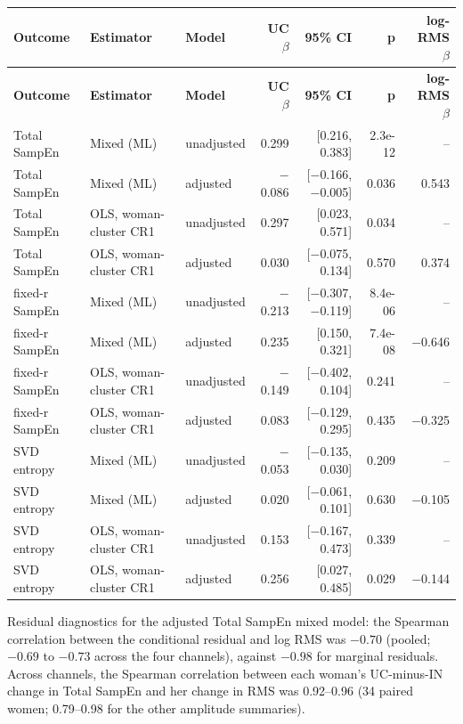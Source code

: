 \documentclass[10pt]{article}
\begin{document}
\begin{longtable}{p{2.8cm}p{3.2cm}p{1.8cm}rrrr}
\toprule
\textbf{Outcome} & \textbf{Estimator} & \textbf{Model} & \textbf{UC $\beta$} & \textbf{95\% CI} & \textbf{p} & \textbf{log-RMS $\beta$} \\
\midrule
\endfirsthead
\toprule
\textbf{Outcome} & \textbf{Estimator} & \textbf{Model} & \textbf{UC $\beta$} & \textbf{95\% CI} & \textbf{p} & \textbf{log-RMS $\beta$} \\
\midrule
\endhead
Total SampEn & Mixed (ML) & unadjusted & 0.299 & [0.216, 0.383] & 2.3e-12 & -- \\
Total SampEn & Mixed (ML) & adjusted & $-$0.086 & [$-$0.166, $-$0.005] & 0.036 & 0.543 \\
Total SampEn & OLS, woman-cluster CR1 & unadjusted & 0.297 & [0.023, 0.571] & 0.034 & -- \\
Total SampEn & OLS, woman-cluster CR1 & adjusted & 0.030 & [$-$0.075, 0.134] & 0.570 & 0.374 \\
fixed-r SampEn & Mixed (ML) & unadjusted & $-$0.213 & [$-$0.307, $-$0.119] & 8.4e-06 & -- \\
fixed-r SampEn & Mixed (ML) & adjusted & 0.235 & [0.150, 0.321] & 7.4e-08 & $-$0.646 \\
fixed-r SampEn & OLS, woman-cluster CR1 & unadjusted & $-$0.149 & [$-$0.402, 0.104] & 0.241 & -- \\
fixed-r SampEn & OLS, woman-cluster CR1 & adjusted & 0.083 & [$-$0.129, 0.295] & 0.435 & $-$0.325 \\
SVD entropy & Mixed (ML) & unadjusted & $-$0.053 & [$-$0.135, 0.030] & 0.209 & -- \\
SVD entropy & Mixed (ML) & adjusted & 0.020 & [$-$0.061, 0.101] & 0.630 & $-$0.105 \\
SVD entropy & OLS, woman-cluster CR1 & unadjusted & 0.153 & [$-$0.167, 0.473] & 0.339 & -- \\
SVD entropy & OLS, woman-cluster CR1 & adjusted & 0.256 & [0.027, 0.485] & 0.029 & $-$0.144 \\
\bottomrule
\end{longtable}
\par\smallskip\noindent\footnotesize Residual diagnostics for the adjusted Total SampEn mixed model: the Spearman correlation between the conditional residual and log RMS was $-0.70$ (pooled; $-0.69$ to $-0.73$ across the four channels), against $-0.98$ for marginal residuals. Across channels, the Spearman correlation between each woman's UC-minus-IN change in Total SampEn and her change in RMS was 0.92--0.96 (34 paired women; 0.79--0.98 for the other amplitude summaries).\normalsize
\end{document}

